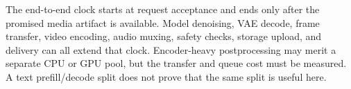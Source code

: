 The end-to-end clock starts at request acceptance and ends only after
the promised media artifact is available. Model denoising, VAE decode,
frame transfer, video encoding, audio muxing, safety checks, storage
upload, and delivery can all extend that clock. Encoder-heavy
postprocessing may merit a separate CPU or GPU pool, but the transfer
and queue cost must be measured. A text prefill/decode split does not
prove that the same split is useful here.
